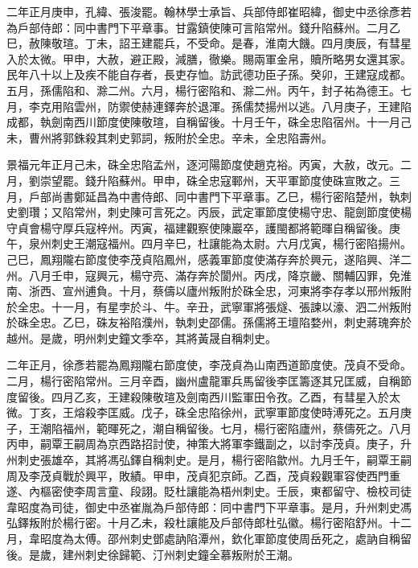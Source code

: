 \begin{pinyinscope}
 二年正月庚申，孔緯、張浚罷。翰林學士承旨、兵部侍郎崔昭緯，御史中丞徐彥若為戶部侍郎：同中書門下平章事。甘露鎮使陳可言陷常州。錢升陷蘇州。二月乙巳，赦陳敬瑄。丁未，詔王建罷兵，不受命。是春，淮南大饑。四月庚辰，有彗星入於太微。甲申，大赦，避正殿，減膳，徹樂。賜兩軍金帛，贖所略男女還其家。民年八十以上及疾不能自存者，長吏存恤。訪武德功臣子孫。癸卯，王建寇成都。五月，孫儒陷和、滁二州。六月，楊行密陷和、滁二州。丙午，封子祐為德王。七月，李克用陷雲州，防禦使赫連鐸奔於退渾。孫儒焚揚州以逃。八月庚子，王建陷成都，執劍南西川節度使陳敬瑄，自稱留後。十月壬午，硃全忠陷宿州。十一月己未，曹州將郭銖殺其刺史郭詞，叛附於全忠。辛未，全忠陷壽州。



 景福元年正月己未，硃全忠陷孟州，逐河陽節度使趙克裕。丙寅，大赦，改元。二月，劉崇望罷。錢升陷蘇州。甲申，硃全忠寇鄆州，天平軍節度使硃宣敗之。三月，戶部尚書鄭延昌為中書侍郎、同中書門下平章事。乙巳，楊行密陷楚州，執刺史劉瓚；又陷常州，刺史陳可言死之。丙辰，武定軍節度使楊守忠、龍劍節度使楊守貞會楊守厚兵寇梓州。丙寅，福建觀察使陳巖卒，護閩都將範暉自稱留後。庚午，泉州刺史王潮寇福州。四月辛巳，杜讓能為太尉。六月戊寅，楊行密陷揚州。己巳，鳳翔隴右節度使李茂貞陷鳳州，感義軍節度使滿存奔於興元，遂陷興、洋二州。八月壬申，寇興元，楊守亮、滿存奔於閬州。丙戌，降京畿、關輔囚罪，免淮南、浙西、宣州逋負。十月，蔡儔以廬州叛附於硃全忠，河東將李存孝以邢州叛附於全忠。十一月，有星孛於斗、牛。辛丑，武寧軍將張燧、張諫以濠、泗二州叛附於硃全忠。乙巳，硃友裕陷濮州，執刺史邵儒。孫儒將王壇陷婺州，刺史蔣瑰奔於越州。是歲，明州刺史鐘文季卒，其將黃晟自稱刺史。



 二年正月，徐彥若罷為鳳翔隴右節度使，李茂貞為山南西道節度使。茂貞不受命。二月，楊行密陷常州。三月辛酉，幽州盧龍軍兵馬留後李匡籌逐其兄匡威，自稱節度留後。四月乙亥，王建殺陳敬瑄及劍南西川監軍田令孜。乙酉，有彗星入於太微。丁亥，王熔殺李匡威。戊子，硃全忠陷徐州，武寧軍節度使時溥死之。五月庚子，王潮陷福州，範暉死之，潮自稱留後。七月，楊行密陷廬州，蔡儔死之。八月丙申，嗣覃王嗣周為京西路招討使，神策大將軍李鐵副之，以討李茂貞。庚子，升州刺史張雄卒，其將馮弘鐸自稱刺史。是月，楊行密陷歙州。九月壬午，嗣覃王嗣周及李茂貞戰於興平，敗績。甲申，茂貞犯京師。乙酉，茂貞殺觀軍容使西門重遂、內樞密使李周言童、段詡。貶杜讓能為梧州刺史。壬辰，東都留守、檢校司徒韋昭度為司徒，御史中丞崔胤為戶部侍郎：同中書門下平章事。是月，升州刺史馮弘鐸叛附於楊行密。十月乙未，殺杜讓能及戶部侍郎杜弘徽。楊行密陷舒州。十二月，韋昭度為太傅。邵州刺史鄧處訥陷潭州，欽化軍節度使周岳死之，處訥自稱留後。是歲，建州刺史徐歸範、汀州刺史鐘全慕叛附於王潮。




\end{pinyinscope}
